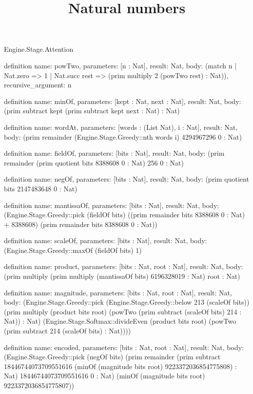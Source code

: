 \begin{lexlean}{Engine.Stage.Attention}
\title{Natural numbers}
\begin{semanticmodule}
definition{
  name: powTwo,
  parameters: [n : Nat],
  result: Nat,
  body: (match n | Nat.zero => 1 | Nat.succ rest => (prim multiply 2 (powTwo rest) : Nat)),
  recursive_argument: n
}

definition{
  name: minOf,
  parameters: [kept : Nat, next : Nat],
  result: Nat,
  body: (prim subtract kept (prim subtract kept next : Nat) : Nat)
}

definition{
  name: wordAt,
  parameters: [words : (List Nat), i : Nat],
  result: Nat,
  body: (prim remainder (Engine.Stage.Greedy::nth words i) 4294967296 0 : Nat)
}

definition{
  name: fieldOf,
  parameters: [bits : Nat],
  result: Nat,
  body: (prim remainder (prim quotient bits 8388608 0 : Nat) 256 0 : Nat)
}

definition{
  name: negOf,
  parameters: [bits : Nat],
  result: Nat,
  body: (prim quotient bits 2147483648 0 : Nat)
}

definition{
  name: mantissaOf,
  parameters: [bits : Nat],
  result: Nat,
  body: (Engine.Stage.Greedy::pick (fieldOf bits) ((prim remainder bits 8388608 0 : Nat) + 8388608) (prim remainder bits 8388608 0 : Nat))
}

definition{
  name: scaleOf,
  parameters: [bits : Nat],
  result: Nat,
  body: (Engine.Stage.Greedy::maxOf (fieldOf bits) 1)
}

definition{
  name: product,
  parameters: [bits : Nat, root : Nat],
  result: Nat,
  body: (prim multiply (prim multiply (mantissaOf bits) 6196328019 : Nat) root : Nat)
}

definition{
  name: magnitude,
  parameters: [bits : Nat, root : Nat],
  result: Nat,
  body: (Engine.Stage.Greedy::pick (Engine.Stage.Greedy::below 213 (scaleOf bits)) (prim multiply (product bits root) (powTwo (prim subtract (scaleOf bits) 214 : Nat)) : Nat) (Engine.Stage.Softmax::divideEven (product bits root) (powTwo (prim subtract 214 (scaleOf bits) : Nat))))
}

definition{
  name: encoded,
  parameters: [bits : Nat, root : Nat],
  result: Nat,
  body: (Engine.Stage.Greedy::pick (negOf bits) (prim remainder (prim subtract 18446744073709551616 (minOf (magnitude bits root) 9223372036854775808) : Nat) 18446744073709551616 0 : Nat) (minOf (magnitude bits root) 9223372036854775807))
}


\end{semanticmodule}
\end{lexlean}

